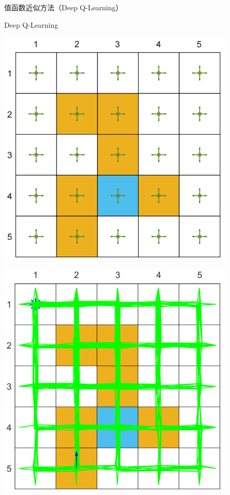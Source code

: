 \begin{section}{值函数近似方法\alert{（Deep Q-Learning）}}
\begin{frame}{Deep Q-Learning}
    \begin{center}
        \begin{minipage}{0.18\textwidth}
            \centering
            \includegraphics[width=\linewidth]{assets/DQN100behavior.png}
        \end{minipage}
        \hspace{1cm}
        \begin{minipage}{0.18\textwidth}
            \centering
            \includegraphics[width=\linewidth]{assets/DQN1000episode.png}

\end{minipage}
\end{center}
\end{frame}
\end{section}
